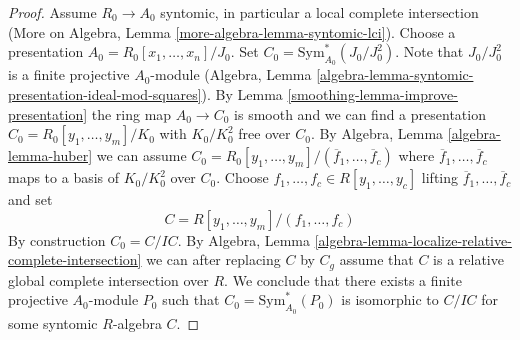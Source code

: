 \begin{proof}

Assume $R_0 \to A_0$ syntomic, in particular a local complete intersection
(More on Algebra, Lemma \ref{more-algebra-lemma-syntomic-lci}).
Choose a presentation $A_0 = R_0[x_1, \ldots, x_n]/J_0$. Set
$C_0 = \text{Sym}^*_{A_0}(J_0/J_0^2)$. Note that $J_0/J_0^2$ is a finite
projective $A_0$-module (Algebra, Lemma
\ref{algebra-lemma-syntomic-presentation-ideal-mod-squares}).
By Lemma \ref{smoothing-lemma-improve-presentation} the ring map
$A_0 \to C_0$ is smooth and we can find a presentation
$C_0 = R_0[y_1, \ldots, y_m]/K_0$ with $K_0/K_0^2$ free over $C_0$.
By Algebra, Lemma \ref{algebra-lemma-huber} we can assume
$C_0 = R_0[y_1, \ldots, y_m]/(\overline{f}_1, \ldots, \overline{f}_c)$
where $\overline{f}_1, \ldots, \overline{f}_c$ maps to a basis of
$K_0/K_0^2$ over $C_0$. Choose
$f_1, \ldots, f_c \in R[y_1, \ldots, y_c]$ lifting
$\overline{f}_1, \ldots, \overline{f}_c$ and set
$$
C = R[y_1, \ldots, y_m]/(f_1, \ldots, f_c)
$$
By construction $C_0 = C/IC$. By Algebra, Lemma
\ref{algebra-lemma-localize-relative-complete-intersection}
we can after replacing $C$ by $C_g$ assume that $C$ is a relative
global complete intersection over $R$.
We conclude that there exists a finite projective $A_0$-module
$P_0$ such that $C_0 = \text{Sym}^*_{A_0}(P_0)$
is isomorphic to $C/IC$ for some syntomic $R$-algebra $C$.


\end{proof}
